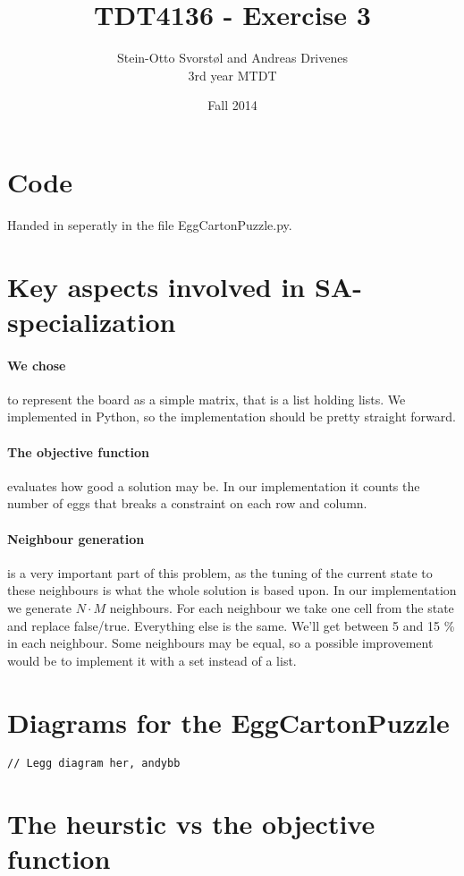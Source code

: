 \documentclass[11pt,a4paper]{article}
\author{Stein-Otto Svorstøl and Andreas Drivenes
\\3rd year MTDT}
\title{TDT4136 - Exercise 3}
\date{Fall 2014}
\begin{document}
\maketitle
\section{Code}
Handed in seperatly in the file EggCartonPuzzle.py.

\section{Key aspects involved in SA-specialization}
\paragraph{We chose} to represent the board as a simple matrix, that is a list holding lists. We implemented in Python, so the implementation should be pretty straight forward.

\paragraph{The objective function} evaluates how good a solution may be. In our implementation it counts the number of eggs that breaks a constraint on each row and column.

\paragraph{Neighbour generation} is a very important part of this problem, as the tuning of the current state to these neighbours is what the whole solution is based upon. In our implementation we generate \begin{math}N\cdot M\end{math} neighbours. For each neighbour we take one cell from the state and replace false/true. Everything else is the same. We'll get between 5 and 15 \% in each neighbour. Some neighbours may be equal, so a possible improvement would be to implement it with a set instead of a list.
\section{Diagrams for the EggCartonPuzzle}
\begin{lstlisting}
// Legg diagram her, andybb
\end{lstlisting}

\section{The heurstic vs the objective function}
\end{document}
